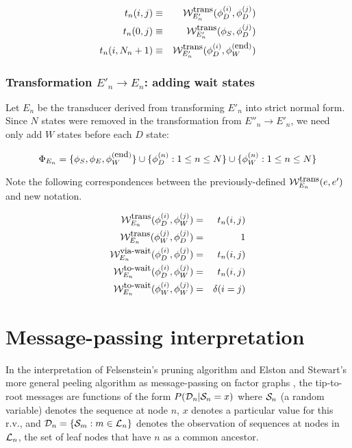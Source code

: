 \documentclass{article}
\newcommand{\seclabel}[1]{\label{sec.#1}}
\newcommand\States{\Phi}
\newcommand\statesof[1]{\States_{#1}}
\newcommand\startstate{\phi_S}
\newcommand\laststate{\phi_E}
\newcommand\weight{{\cal W}}
\newcommand\weightfunof[1]{\weight_{#1}}
\newcommand\transweightfun[1]{\weightfunof{#1}^{\mbox{\small trans}}}
\newcommand\transviawait[1]{\weightfunof{#1}^{\mbox{\small via-wait}}}
\newcommand\transtowait[1]{\weightfunof{#1}^{\mbox{\small to-wait}}}
\newcommand\leaves{{\cal L}}
\newcommand\outputs{{\cal D}}
\newcommand\outputn[1]{{\cal S}_{#1}}
\newcommand\newTransName[1]{t_{#1}}
\newcommand\numStates[1]{N_{#1}}
\newcommand\profiledelete[1]{\phi_D^{(#1)}}
\newcommand\profilewait[1]{\phi_W^{(#1)}}
\newcommand\profileterminate{\profilewait{\mbox{\small end}}}
\begin{document}
\begin{eqnarray*}
\newTransName{n}(i,j) & \equiv & \transweightfun{E'_n}(\profiledelete{i},\profiledelete{j}) \\
\newTransName{n}(0,j) & \equiv & \transweightfun{E'_n}(\startstate,\profiledelete{j})  \\
\newTransName{n}(i,\numStates{n}+1) & \equiv & \transweightfun{E'_n}(\profiledelete{i}, \profileterminate)  \\
\end{eqnarray*}




\subsubsection{Transformation $E'_n \to E_n$: adding wait states}

Let $E_n$ be the transducer derived from transforming $E'_n$ into strict normal form.  Since $N$ states were removed in the transformation from $E''_n \rightarrow E'_n$, we need only add $W$ states before each $D$ state:

\[
\statesof{E_n} = \{ \startstate, \laststate , \profileterminate \} \cup  \{\profiledelete{n} : 1 \leq n \leq N \}
\cup  \{\profilewait{n} : 1 \leq n \leq N \}
\]

Note the following correspondences between the previously-defined  $\transweightfun{E_n}(e,e')$ and new notation. 

\begin{eqnarray*}
\transweightfun{E_n}(\profiledelete{i},\profilewait{j}) & = & \newTransName{n}(i,j) \\
\transweightfun{E_n}(\profilewait{j},\profiledelete{j}) & = & 1 \\
\transviawait{E_n}(\profiledelete{i},\profiledelete{j}) & = & \newTransName{n}(i,j) \\
\transtowait{E_n}(\profiledelete{i},\profilewait{j}) & = & \newTransName{n}(i,j) \\
\transtowait{E_n}(\profilewait{i},\profilewait{j}) & = & \delta(i=j) \\
\end{eqnarray*}

\section{Message-passing interpretation}
\seclabel{MessagePassing}

In the interpretation of Felsenstein's pruning algorithm \cite{Felsenstein81} and Elston and Stewart's more general peeling algorithm \cite{ElstonStewart71} as message-passing on factor graphs \cite{KschischangEtAl98},
the tip-to-root messages are functions of the form
$P(\outputs_n|\outputn{n}=x)$ where $\outputn{n}$ (a random variable) denotes the sequence at node $n$,
$x$ denotes a particular value for this r.v.,
and
$\outputs_n = \{ \outputn{m} : m \in \leaves_n \}$
denotes the observation of sequences at nodes in $\leaves_n$, the set of leaf nodes that have $n$ as a common ancestor.
\end{document}
